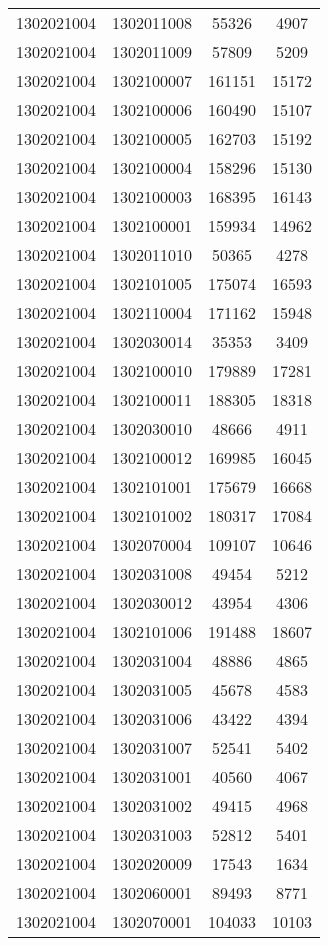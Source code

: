 \begin{longtable}{llcc}
1302021004 & 1302011008 & 55326 & 4907\\
1302021004 & 1302011009 & 57809 & 5209\\
1302021004 & 1302100007 & 161151 & 15172\\
1302021004 & 1302100006 & 160490 & 15107\\
1302021004 & 1302100005 & 162703 & 15192\\
1302021004 & 1302100004 & 158296 & 15130\\
1302021004 & 1302100003 & 168395 & 16143\\
1302021004 & 1302100001 & 159934 & 14962\\
1302021004 & 1302011010 & 50365 & 4278\\
1302021004 & 1302101005 & 175074 & 16593\\
1302021004 & 1302110004 & 171162 & 15948\\
1302021004 & 1302030014 & 35353 & 3409\\
1302021004 & 1302100010 & 179889 & 17281\\
1302021004 & 1302100011 & 188305 & 18318\\
1302021004 & 1302030010 & 48666 & 4911\\
1302021004 & 1302100012 & 169985 & 16045\\
1302021004 & 1302101001 & 175679 & 16668\\
1302021004 & 1302101002 & 180317 & 17084\\
1302021004 & 1302070004 & 109107 & 10646\\
1302021004 & 1302031008 & 49454 & 5212\\
1302021004 & 1302030012 & 43954 & 4306\\
1302021004 & 1302101006 & 191488 & 18607\\
1302021004 & 1302031004 & 48886 & 4865\\
1302021004 & 1302031005 & 45678 & 4583\\
1302021004 & 1302031006 & 43422 & 4394\\
1302021004 & 1302031007 & 52541 & 5402\\
1302021004 & 1302031001 & 40560 & 4067\\
1302021004 & 1302031002 & 49415 & 4968\\
1302021004 & 1302031003 & 52812 & 5401\\
1302021004 & 1302020009 & 17543 & 1634\\
1302021004 & 1302060001 & 89493 & 8771\\
1302021004 & 1302070001 & 104033 & 10103\\

\end{longtable}
